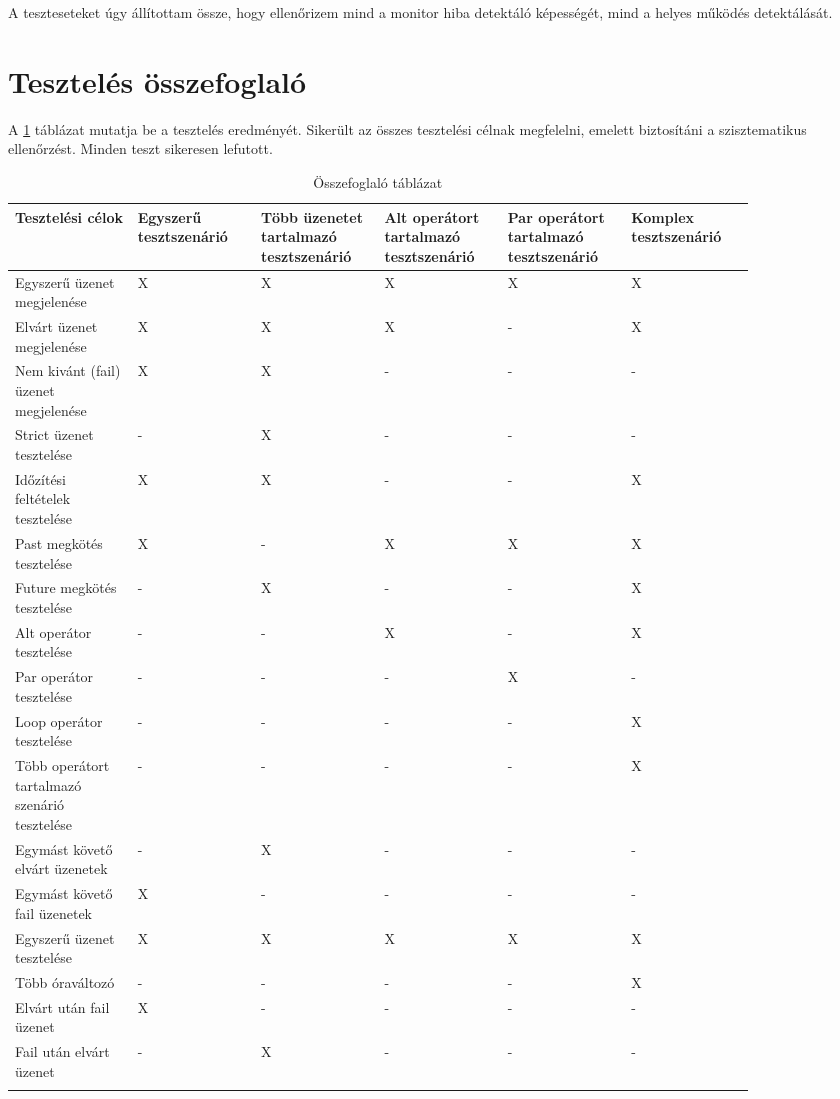 A teszteseteket úgy állítottam össze, hogy ellenőrizem mind a monitor hiba detektáló képességét, mind a helyes működés detektálását.

\clearpage\section{Tesztelés összefoglaló}

A \ref{tab:table1} táblázat mutatja be a tesztelés eredményét.
Sikerült az összes tesztelési célnak megfelelni, emelett biztosítáni a szisztematikus ellenőrzést.
Minden teszt sikeresen lefutott.

\begin{longtable}{|p{0.1428\linewidth}|p{0.1428\linewidth}|p{0.1428\linewidth}|p{0.1428\linewidth}|p{0.1428\linewidth}|p{0.1428\linewidth}|}
\hline
\textbf{Tesztelési célok} & \textbf{Egyszerű tesztszenárió} & \textbf{Több üzenetet tartalmazó tesztszenárió} & \textbf{Alt operátort tartalmazó tesztszenárió} & \textbf{Par operátort tartalmazó tesztszenárió} & \textbf{Komplex tesztszenárió}\\
\hline
Egyszerű üzenet megjelenése & X & X & X & X & X\\
\hline
Elvárt üzenet megjelenése & X & X & X & - & X\\
\hline
Nem kivánt (fail) üzenet megjelenése & X & X & - & - & -\\
\hline
Strict üzenet tesztelése & - & X & - & - & -\\
\hline
Időzítési feltételek tesztelése & X & X & - & - & X\\
\hline
Past megkötés tesztelése & X & - & X & X & X\\
\hline
Future megkötés tesztelése & - & X & - & - & X\\
\hline
Alt operátor tesztelése & - & - & X & - & X\\
\hline
Par operátor tesztelése & - & - & - & X & -\\
\hline
Loop operátor tesztelése & - & - & - & - & X\\
\hline
Több operátort tartalmazó szenárió tesztelése & - & - & - & - & X\\
\hline
Egymást követő elvárt üzenetek & - & X & - & - & -\\
\hline
Egymást követő fail üzenetek & X & - & - & - & -\\
\hline
Egyszerű üzenet tesztelése & X & X & X & X & X\\
\hline
Több óraváltozó & - & - & - & - & X\\
\hline
Elvárt után fail üzenet & X & - & - & - & -\\
\hline
Fail után elvárt üzenet & - & X & - & - & -\\
\hline
\caption{Összefoglaló táblázat}
\label{tab:table1}
\end{longtable}
